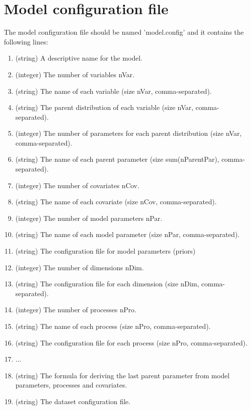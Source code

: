 \documentclass[a4paper]{article}
\begin{document}
	\section{Model configuration file}
	
	The model configuration file should be named 'model.config' and it contains the following lines:
	
	\begin{enumerate}
		\item (string) A descriptive name for the model.
		\item (integer) The number of variables nVar.
		\item (string) The name of each variable (size nVar, comma-separated).
		\item  (string) The parent distribution of each variable (size nVar, comma-separated).
		\item (integer) The number of parameters for each parent distribution (size nVar, comma-separated).
		\item (string) The name of each parent parameter (size sum(nParentPar), comma-separated).
		\item (integer) The number of covariates nCov.
		\item (string) The name of each covariate (size nCov, comma-separated).
		\item (integer) The number of model parameters nPar.
		\item (string) The name of each model parameter (size nPar, comma-separated).
		\item (string) The configuration file for model parameters (priors)
		\item (integer) The number of dimensions nDim.
		\item (string) The configuration file for each dimension (size nDim, comma-separated).
		\item (integer) The number of processes nPro.
		\item (string) The name of each process (size nPro, comma-separated).
		\item (string) The configuration file for each process (size nPro, comma-separated).
		\item ...
		\item (string) The formula for deriving the last parent parameter from model parameters, processes and covariates. 
		\item (string) The dataset configuration file.
	\end{enumerate}
		
\end{document}
